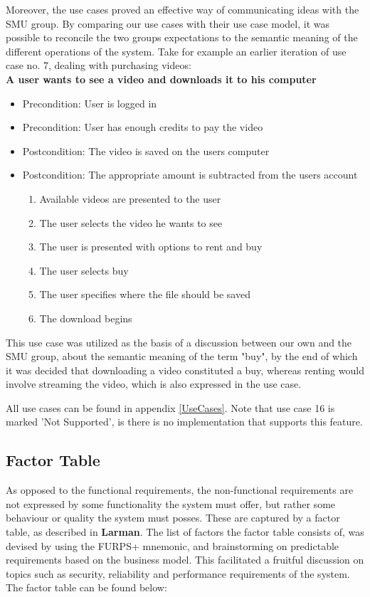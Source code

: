 Moreover, the use cases proved an effective way of communicating ideas with the SMU group. By comparing our use cases with their use case model, it was possible to reconcile the two groups expectations to the semantic meaning of the different operations of the system. Take for example an earlier iteration of use case no. 7, dealing with purchasing videos:\\

\textbf{A user wants to see a video and downloads it to his computer}
\begin{itemize}
\item Precondition: User is logged in
\item Precondition: User has enough credits to pay the video
\item Postcondition: The video is saved on the users computer
\item Postcondition: The appropriate amount is subtracted from the users account
\begin{enumerate}
\item Available videos are presented to the user
\item The user selects the video he wants to see
\item The user is presented with options to rent and buy
\item The user selects buy
\item The user specifies where the file should be saved
\item The download begins
\end{enumerate}
\end{itemize}

This use case was utilized as the basis of a discussion between our own and the SMU group, about the semantic meaning of the term "buy", by the end of which it was decided that downloading a video constituted a buy, whereas renting would involve streaming the video, which is also expressed in the use case.

All use cases can be found in appendix \ref{UseCases}. Note that use case 16 is marked 'Not Supported', is there is no implementation that supports this feature.

\subsection{Factor Table}
\label{FactorTable}
As opposed to the functional requirements, the non-functional requirements are not expressed by some functionality the system must offer, but rather some behaviour or quality the system must posses. These are captured by a factor table, as described in \textbf{Larman}. The list of factors the factor table consists of, was devised by using the FURPS+ mnemonic, and brainstorming on predictable requirements based on the business model. This facilitated a fruitful discussion on topics such as security, reliability and performance requirements of the system. The factor table can be found below:

